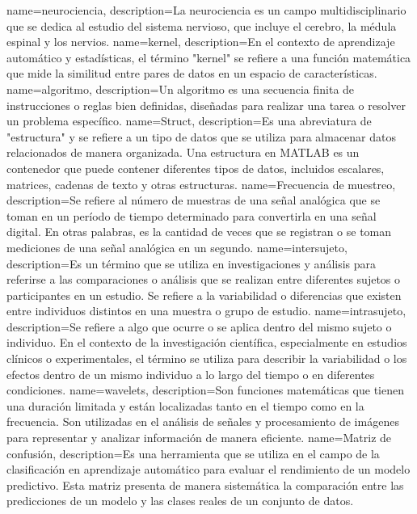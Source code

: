 {
    name=neurociencia,
    description={La neurociencia es un campo multidisciplinario que se dedica al estudio del sistema nervioso, que incluye el cerebro, la médula espinal y los nervios.}
}  
{
    name=kernel,
    description={En el contexto de aprendizaje automático y estadísticas, el término "kernel" se refiere a una función matemática que mide la similitud entre pares de datos en un espacio de características.} 
}
{
	name=algoritmo,
	description={Un algoritmo es una secuencia finita de instrucciones o reglas bien definidas, diseñadas para realizar una tarea o resolver un problema específico.} 
}
{
	name=Struct,
	description={Es una abreviatura de "estructura" y se refiere a un tipo de datos que se utiliza para almacenar datos relacionados de manera organizada. Una estructura en MATLAB es un contenedor que puede contener diferentes tipos de datos, incluidos escalares, matrices, cadenas de texto y otras estructuras.} 
}
{
	name=Frecuencia de muestreo,
	description={Se refiere al número de muestras de una señal analógica que se toman en un período de tiempo determinado para convertirla en una señal digital. En otras palabras, es la cantidad de veces que se registran o se toman mediciones de una señal analógica en un segundo.} 
}
{
	name=intersujeto,
	description={Es un término que se utiliza en investigaciones y análisis para referirse a las comparaciones o análisis que se realizan entre diferentes sujetos o participantes en un estudio. Se refiere a la variabilidad o diferencias que existen entre individuos distintos en una muestra o grupo de estudio.} 
}
{
	name=intrasujeto,
	description={Se refiere a algo que ocurre o se aplica dentro del mismo sujeto o individuo. En el contexto de la investigación científica, especialmente en estudios clínicos o experimentales, el término se utiliza para describir la variabilidad o los efectos dentro de un mismo individuo a lo largo del tiempo o en diferentes condiciones.} 
}
{
	name=wavelets,
	description={Son funciones matemáticas que tienen una duración limitada y están localizadas tanto en el tiempo como en la frecuencia. Son utilizadas en el análisis de señales y procesamiento de imágenes para representar y analizar información de manera eficiente.} 
}
{
	name=Matriz de confusión,
	description={Es una herramienta que se utiliza en el campo de la clasificación en aprendizaje automático para evaluar el rendimiento de un modelo predictivo. Esta matriz presenta de manera sistemática la comparación entre las predicciones de un modelo y las clases reales de un conjunto de datos.} 
}
